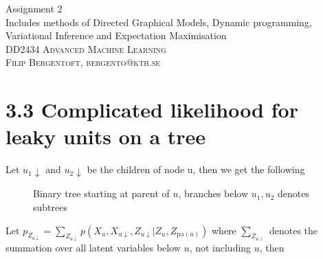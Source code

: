\documentclass[11pt,oneside,a4paper]{article}
\date{}
\theoremstyle{definition}
\theoremstyle{remark}
\begin{document}
\renewcommand{\bibname}{References}
\hypersetup{citecolor=black}
\begin{titlepage}\centering
\vspace*{\fill}
\Huge Assignment 2\\
\vspace*{10mm}
\large Includes methods of Directed Graphical Models, Dynamic programming, Variational Inference and Expectation Maximisation \\
\vspace*{\fill}
\large \textsc{DD2434 Advanced Machine Learning} \\
\textsc{Filip Bergentoft, bergento@kth.se} \\
\end{titlepage}

\newpage


\section*{3.3 Complicated likelihood for leaky units on a tree}


Let $u_{1}\downarrow$ and $u_{2}\downarrow$ be the children of node u, then we get the following 


\begin{figure}[H]
\begin{center}
\end{center}
  \caption{Binary tree starting at parent of $u$, branches below $u_1, u_2$ denotes subtrees}
\end{figure}
Let $p_{Z_{u \downarrow}} = \sum_{Z_{u \downarrow}} p(X_u, X_{u \downarrow}, Z_{u \downarrow}|Z_u, Z_{\text{pa}(u)})$ where $\sum_{Z_{u \downarrow}}$ denotes the summation over all latent variables below $u$, not including $u$, then
\end{document}
